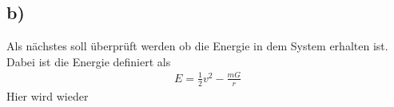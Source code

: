 \subsection*{b)}
Als nächstes soll überprüft werden ob die Energie in dem System erhalten ist.
Dabei ist die Energie definiert als
\begin{align}
	E=\frac{1}{2}v^2-\frac{mG}{r}
\end{align}
Hier wird wieder 
